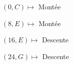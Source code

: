\documentclass[preview]{standalone}
\begin{document}
\begin{center}
$(0,C) \mapsto$ Montée

$(8,E) \mapsto$ Montée

$(16,E) \mapsto$ Descente

$(24,G) \mapsto$ Descente
\end{center}
\end{document}
